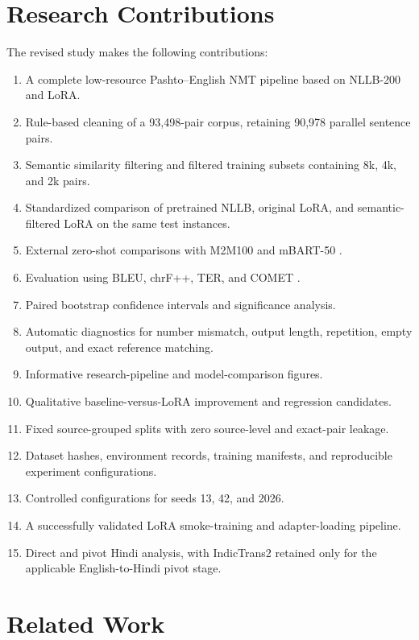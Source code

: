 \documentclass[conference]{IEEEtran}
\begin{document}
\section{Research Contributions}

The revised study makes the following contributions:

\begin{enumerate}
    \item A complete low-resource Pashto--English NMT
    pipeline based on NLLB-200 and LoRA.
    \item Rule-based cleaning of a 93,498-pair corpus,
    retaining 90,978 parallel sentence pairs.
    \item Semantic similarity filtering and filtered
    training subsets containing 8k, 4k, and 2k pairs.
    \item Standardized comparison of pretrained NLLB,
    original LoRA, and semantic-filtered LoRA on the
    same test instances.
    \item External zero-shot comparisons with M2M100
    and mBART-50 \cite{m2m100,mbart50}.
    \item Evaluation using BLEU, chrF++, TER, and
    COMET \cite{comet}.
    \item Paired bootstrap confidence intervals and
    significance analysis.
    \item Automatic diagnostics for number mismatch,
    output length, repetition, empty output, and exact
    reference matching.
    \item Informative research-pipeline and
    model-comparison figures.
    \item Qualitative baseline-versus-LoRA improvement
    and regression candidates.
    \item Fixed source-grouped splits with zero
    source-level and exact-pair leakage.
    \item Dataset hashes, environment records, training
    manifests, and reproducible experiment configurations.
    \item Controlled configurations for seeds 13, 42,
    and 2026.
    \item A successfully validated LoRA smoke-training
    and adapter-loading pipeline.
    \item Direct and pivot Hindi analysis, with
    IndicTrans2 retained only for the applicable
    English-to-Hindi pivot stage.
\end{enumerate}

\section{Related Work}
\end{document}
